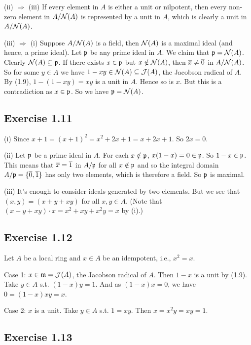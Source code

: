 \documentclass[../A&M.tex]{subfiles}
\begin{document}
(ii) $\Rightarrow$ (iii) If every element in $A$ is either a unit or nilpotent, then every non-zero element in $A/\mathcal{N}(A)$ is represented by a unit in $A$, which is clearly a unit in $A/\mathcal{N}(A)$.

(iii) $\Rightarrow$ (i) Suppose $A/\mathcal{N}(A)$ is a field, then $\mathcal{N}(A)$ is a maximal ideal (and hence, a prime ideal). Let $\mathfrak{p}$ be any prime ideal in $A$. We claim that $\mathfrak{p}=\mathcal{N}(A)$. Clearly $\mathcal{N}(A) \subseteq \mathfrak{p}$. If there exists $x\in\mathfrak{p}$ but $x\notin\mathcal{N}(A)$, then $\overline{x} \neq \overline{0}$ in $A/\mathcal{N}(A)$. So for some $y\in A$ we have $1-xy\in\mathcal{N}(A) \subseteq \mathcal{J}(A)$, the Jacobson radical of $A$. By (1.9), $1-(1-xy) = xy$ is a unit in $A$. Hence so is $x$. But this is a contradiction as $x\in\mathfrak{p}$. So we have $\mathfrak{p}=\mathcal{N}(A)$.

\subsection*{Exercise 1.11}

(i) Since $x+1 = (x+1)^2 = x^2 + 2x + 1 = x + 2x + 1$. So $2x=0$.

(ii) Let $\mathfrak{p}$ be a prime ideal in $A$. For each $x\notin\mathfrak{p}$, $x(1-x)=0\in\mathfrak{p}$. So $1-x\in\mathfrak{p}$. This means that $\overline{x}=\overline{1}$ in $A/\mathfrak{p}$ for all $x\notin\mathfrak{p}$ and so the integral domain $A/\mathfrak{p} = \{\overline{0},\overline{1}\}$ has only two elements, which is therefore a field. So $\mathfrak{p}$ is maximal.

(iii) It's enough to consider ideals generated by two elements. But we see that $(x,y)=(x+y+xy)$ for all $x,y\in A$. (Note that $(x+y+xy)\cdot x = x^2+xy+x^2y = x$ by (i).)

\subsection*{Exercise 1.12}

Let $A$ be a local ring and $x\in A$ be an idempotent, i.e., $x^2=x$.

Case 1: $x \in \mathfrak{m} = \mathcal{J}(A)$, the Jacobson radical of $A$. Then $1-x$ is a unit by (1.9). Take $y\in A$ s.t. $(1-x)y = 1$. And as $(1-x)x=0$, we have $0 = (1-x)xy = x$.

Case 2: $x$ is a unit. Take $y\in A$ s.t. $1=xy$. Then $x=x^2y=xy=1$.

\subsection*{Exercise 1.13}
\end{document}
